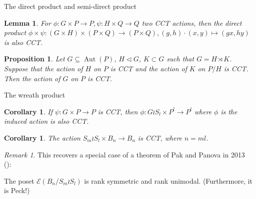 \documentclass{beamer}
\newtheorem{cor}[thm]{Corollary}
\newtheorem{lem}[thm]{Lemma}
\newtheorem{prop}[thm]{Proposition}
\theoremstyle{remark}
\newtheorem{rem}[thm]{Remark}
\begin{document}
\begin{frame}{The direct product and semi-direct product}
\begin{lem}
\label{thm:direct_product_preservation}
For $\phi:G\times P\rightarrow P,\psi:H \times Q \rightarrow Q$ two CCT actions, then the direct product $\phi \times \psi:(G\times H)\times (P\times Q) \rightarrow (P\times Q),(g,h)\cdot (x,y) \mapsto (gx,hy)$ is also CCT.
\end{lem}





\begin{prop}\label{prop:semidirect_product_cover_transitive_actions}
Let $G\subseteq \operatorname{Aut}(P)$, $H\triangleleft G$, $K\subset G$ such that $G = H\rtimes K$.  Suppose that the action of $H$ on $P$ is CCT and the action of $K$ on $P/H$ is CCT.  Then the action of $G$ on $P$ is CCT.
\end{prop}
\end{frame}





\begin{frame}{The wreath product}
\begin{cor}
\label{thm:wreath_preservation}
If $\psi:G\times P \rightarrow P$ is CCT, then $\phi:G\wr S_l \times P^l \rightarrow P^l$ where $\phi$ is the induced action is also CCT.
\end{cor}
\begin{cor}
The action $S_m \wr S_l \times B_{n} \rightarrow B_{n}$ is CCT, where $n =ml$.
\end{cor}
\begin{rem}
This recovers a special case of a theorem of Pak and Panova in 2013 (\cite[Theorem 1.1]{pak}): 

The poset $\mathcal E (B_n/S_m \wr S_l)$ is rank symmetric and rank unimodal. (Furthermore, it is Peck!)
\end{rem}
\end{frame}





\end{document}
